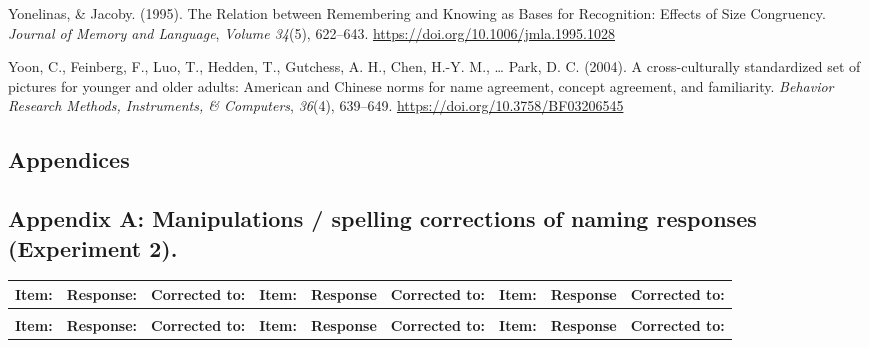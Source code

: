 \documentclass[
  11pt,
]{article}
\begin{document}
\leavevmode\hypertarget{ref-yonelinas1995a}{}%
Yonelinas, \& Jacoby. (1995). The Relation between Remembering and
Knowing as Bases for Recognition: Effects of Size Congruency.
\emph{Journal of Memory and Language}, \emph{Volume 34}(5), 622--643.
\url{https://doi.org/10.1006/jmla.1995.1028}

\leavevmode\hypertarget{ref-yoon2004}{}%
Yoon, C., Feinberg, F., Luo, T., Hedden, T., Gutchess, A. H., Chen,
H.-Y. M., \ldots{} Park, D. C. (2004). A cross-culturally standardized
set of pictures for younger and older adults: American and Chinese norms
for name agreement, concept agreement, and familiarity. \emph{Behavior
Research Methods, Instruments, \& Computers}, \emph{36}(4), 639--649.
\url{https://doi.org/10.3758/BF03206545}

\newpage
\begin{landscape}

\hypertarget{appendices}{%
\section{Appendices}\label{appendices}}

\hypertarget{appendix-a-manipulations-spelling-corrections-of-naming-responses-experiment-2.}{%
\subsection{Appendix A: Manipulations / spelling corrections of naming
responses (Experiment
2).}\label{appendix-a-manipulations-spelling-corrections-of-naming-responses-experiment-2.}}

\begingroup\fontsize{10}{12}\selectfont

\begin{longtable}{>{\raggedright\arraybackslash}p{1.8cm}>{\raggedright\arraybackslash}p{1.8cm}>{\raggedright\arraybackslash}p{2.2cm}|>{\raggedright\arraybackslash}p{1.8cm}>{\raggedright\arraybackslash}p{1.8cm}>{\raggedright\arraybackslash}p{2.2cm}|>{\raggedright\arraybackslash}p{1.8cm}>{\raggedright\arraybackslash}p{1.8cm}>{\raggedright\arraybackslash}p{2.2cm}}
\toprule
\textbf{Item:} & \textbf{Response:} & \textbf{Corrected to:} & \textbf{Item: } & \textbf{Response } & \textbf{Corrected to: } & \textbf{Item:  } & \textbf{Response  } & \textbf{Corrected to:  }\\
\midrule
\endfirsthead
\multicolumn{9}{@{}l}{\textit{(continued)}}\\
\toprule
\textbf{Item:} & \textbf{Response:} & \textbf{Corrected to:} & \textbf{Item: } & \textbf{Response } & \textbf{Corrected to: } & \textbf{Item:  } & \textbf{Response  } & \textbf{Corrected to:  }\\
\midrule
\endhead


\end{longtable}
\end{landscape}
\end{document}
